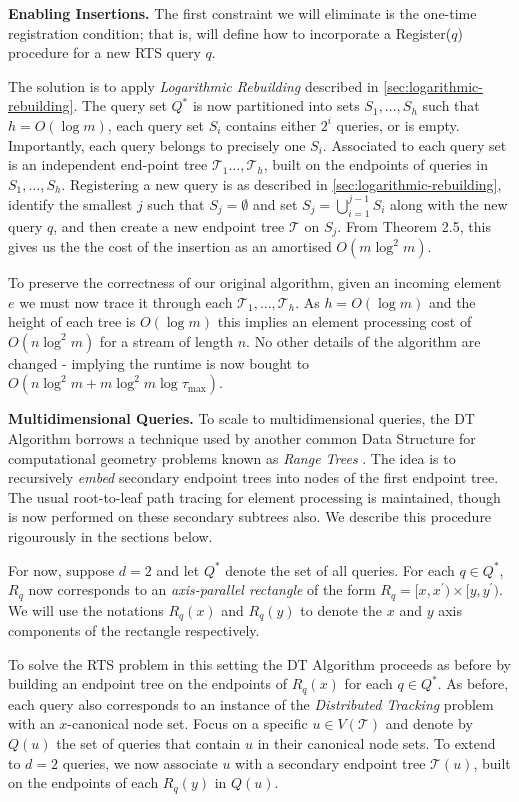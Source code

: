 \textbf{Enabling Insertions.} The first constraint we will eliminate is the one-time registration condition; that is, will define how to incorporate a Register($q$) procedure for a new RTS query $q$. 

The solution is to apply \textit{Logarithmic Rebuilding} described in \cref{sec:logarithmic-rebuilding}. The query set $Q^*$ is now partitioned into sets $S_1,\dots, S_h$ such that $h = O(\log m)$, each query set $S_i$ contains either $2^i$ queries, or is empty. Importantly, each query belongs to precisely one $S_i$. Associated to each query set is an independent end-point tree $\mathcal{T}_1\dots, \mathcal{T}_h$, built on the endpoints of queries in $S_1,\dots,S_h$. Registering a new query is as described in \cref{sec:logarithmic-rebuilding}, identify the smallest $j$ such that $S_j = \emptyset$ and set $S_j = \bigcup_{i=1}^{j-1}S_i$ along with the new query $q$, and then create a new endpoint tree $\mathcal{T}$ on $S_j$. From Theorem 2.5, this gives us the the cost of the insertion as an amortised $O(m\log^2 m)$.

To preserve the correctness of our original algorithm, given an incoming element $e$ we must now trace it through each $\mathcal{T}_1,\dots,\mathcal{T}_h$. As $h = O(\log m)$ and the height of each tree is $O(\log m)$ this implies an element processing cost of $O(n\log ^2 m)$ for a stream of length $n$. No other details of the algorithm are changed - implying the runtime is now bought to $O(n\log^2m + m\log^2m\log\tau_{\max})$.

\textbf{Multidimensional Queries.} 
To scale to multidimensional queries, the DT Algorithm borrows a technique used by another common Data Structure for computational geometry problems known as \textit{Range Trees }\cite{RangeTrees}. The idea is to recursively \textit{embed} secondary endpoint trees  into nodes of the first endpoint tree. The usual root-to-leaf path tracing for element processing is maintained, though is now performed on these secondary subtrees also. We describe this procedure rigourously in the sections below.

For now, suppose $d=2$ and let $Q^*$ denote the set of all queries. For each $q\in Q^*$, $R_q$ now corresponds to an \textit{axis-parallel rectangle} of the form $R_q = [x, x^\prime) \times [y, y^\prime)$. We will use the notations $R_q(x)$ and $R_q(y)$ to denote the $x$ and $y$ axis components of the rectangle respectively. 

To solve the RTS problem in this setting the DT Algorithm proceeds as before by building an endpoint tree on the endpoints of $R_q(x)$ for each $q\in Q^*$. As before, each query also corresponds to an instance of the \textit{Distributed Tracking} problem with an $x$-canonical node set. Focus on a specific $u\in V(\mathcal{T})$ and denote by $Q(u)$ the set of queries that contain $u$ in their canonical node sets. To extend to $d=2$ queries, we now associate $u$ with a secondary endpoint tree $\mathcal{T}(u)$, built on the endpoints of each $R_q(y)$ in $Q(u)$. 

